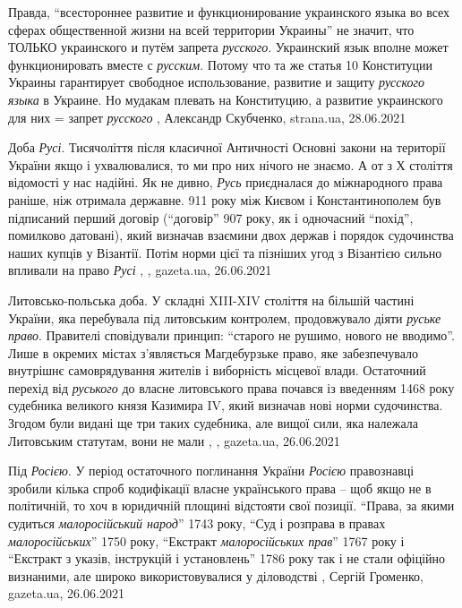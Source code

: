 Правда, \enquote{всестороннее развитие и функционирование украинского языка во всех
сферах общественной жизни на всей территории Украины} не значит, что ТОЛЬКО
украинского и путём запрета \emph{русского}. Украинский язык вполне может
функционировать вместе с \emph{русским}. Потому что та же статья 10 Конституции
Украины гарантирует свободное использование, развитие и защиту \emph{русского языка} в
Украине. Но мудакам плевать на Конституцию, а развитие украинского для них =
запрет \emph{русского}
, 
Александр Скубченко, strana.ua, 28.06.2021


Доба \emph{Русі}. Тисячоліття після класичної Античності Основні закони на території
України якщо і ухвалювалися, то ми про них нічого не знаємо. А от з Х століття
відомості у нас надійні.  Як не дивно, \emph{Русь} приєдналася до міжнародного права
раніше, ніж отримала державне. 911 року між Києвом і Константинополем був
підписаний перший договір (\enquote{договір} 907 року, як і одночасний \enquote{похід},
помилково датовані), який визначав взаємини двох держав і порядок судочинства
наших купців у Візантії. Потім норми цієї та пізніших угод з Візантією сильно
впливали на право \emph{Русі}
, 
, gazeta.ua, 26.06.2021


Литовсько-польська доба. У складні XIII-XIV століття на більшій частині
України, яка перебувала під литовським контролем, продовжувало діяти
\emph{руське право}. Правителі сповідували принцип: \enquote{старого не рушимо,
нового не вводимо}.  Лише в окремих містах з'являється Магдебурзьке право, яке
забезпечувало внутрішнє самоврядування жителів і виборність місцевої влади.
Остаточний перехід від \emph{руського} до власне литовського права почався із
введенням 1468 року судебника великого князя Казимира IV, який визначав нові
норми судочинства.  Згодом були видані ще три таких судебника, але вищої сили,
яка належала Литовським статутам, вони не мали
, 
, gazeta.ua, 26.06.2021


Під \emph{Росією}.  У період остаточного поглинання України \emph{Росією} правознавці зробили
кілька спроб кодифікації власне українського права – щоб якщо не в політичній,
то хоч в юридичній площині відстояти свої позиції. \enquote{Права, за якими судиться
\emph{малоросійський народ}} 1743 року, \enquote{Суд і розправа в правах \emph{малоросійських}} 1750
року, \enquote{Екстракт \emph{малоросійських прав}} 1767 року і \enquote{Екстракт з указів, інструкцій
і установлень} 1786 року так і не стали офіційно визнаними, але широко
використовувалися у діловодстві
, 
Сергій Громенко, gazeta.ua, 26.06.2021

